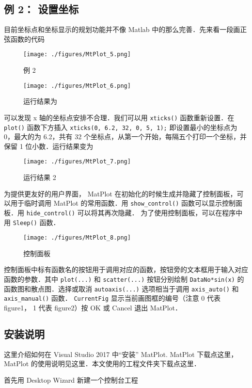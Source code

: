 \subsection{例 2： 设置坐标}

目前坐标点和坐标显示的规划功能并不像 Matlab 中的那么完善．先来看一段画正弦函数的代码

\begin{figure}[ht]
\centering
\texttt{[image: ./figures/MtPlot\_5.png]}
\caption{例 2} \label{MtPlot_fig5}
\end{figure}

\begin{figure}[ht]
\centering
\texttt{[image: ./figures/MtPlot\_6.png]}
\caption{运行结果为} \label{MtPlot_fig6}
\end{figure}

可以发现 x 轴的坐标点安排不合理．我们可以用 \verb|xticks()| 函数重新设置．在 \verb|plot()| 函数下方插入
\verb|xticks(0, 6.2, 32, 0, 5, 1);|
即设置最小的坐标点为 0，最大的为 6.2，共有 32 个坐标点，从第一个开始，每隔五个打印一个坐标，并保留 1 位小数．运行结果变为

\begin{figure}[ht]
\centering
\texttt{[image: ./figures/MtPlot\_7.png]}
\caption{运行结果 2} \label{MtPlot_fig7}
\end{figure}

为提供更友好的用户界面， MatPlot 在初始化的时候生成并隐藏了控制面板，可以用于临时调用 MatPlot 的常用函数．用 \verb|show_control()| 函数可以显示控制面板．用 \verb|hide_control()| 可以将其再次隐藏． 为了使用控制面板，可以在程序中用 \verb|Sleep()| 函数．

\begin{figure}[ht]
\centering
\texttt{[image: ./figures/MtPlot\_8.png]}
\caption{控制面板} \label{MtPlot_fig8}
\end{figure}

控制面板中标有函数名的按钮用于调用对应的函数，按钮旁的文本框用于输入对应函数的参数．其中 \verb|plot(...)| 和 \verb|scatter(...)| 按钮分别绘制 \verb|DataNo*sin(x)| 的函数图和散点图．选择或取消 \verb|autoaxis(...)| 选项相当于调用 \verb|axis_auto()| 和 \verb|axis_manual()| 函数． \verb|CurrentFig| 显示当前画图框的编号（注意 0 代表 figure1， 1 代表 figure2）按 OK 或 Cancel 退出 MatPlot．


\subsection{安装说明}
这里介绍如何在 Visual Studio 2017 中“安装” MatPlot. MatPlot 下载点这里， MatPlot 的使用说明见这里．本文使用的工程文件夹下载点这里．

首先用 Desktop Wizard 新建一个控制台工程
